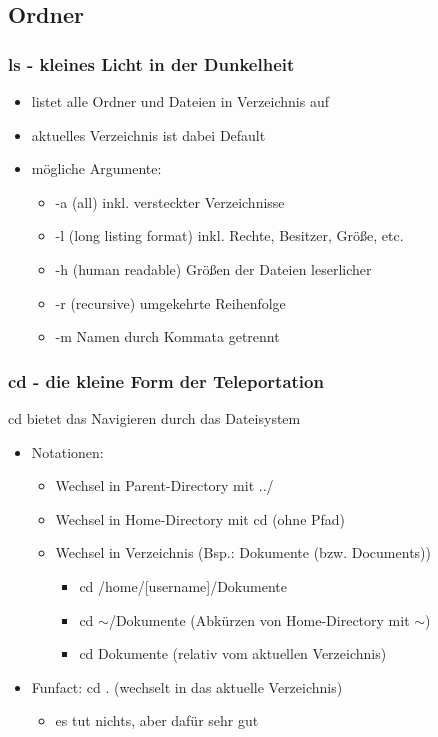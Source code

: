 \documentclass[12pt,utf8]{beamer}
\begin{document}
\subsection{Ordner}
\begin{frame}
\frametitle{ls - kleines Licht in der Dunkelheit}
\begin{itemize}
	\item listet alle Ordner und Dateien in Verzeichnis auf
	\item aktuelles Verzeichnis ist dabei Default
	\item mögliche Argumente:
	\begin{itemize}[<+->]
		\item -a  (all) inkl. versteckter Verzeichnisse
		\item -l  (long listing format) inkl. Rechte, Besitzer, Größe, etc.
		\item -h  (human readable) Größen der Dateien leserlicher
		\item -r  (recursive) umgekehrte Reihenfolge
		\item -m  Namen durch Kommata getrennt
	\end{itemize}
\end{itemize}
\end{frame}

\begin{frame}
\frametitle{cd - die kleine Form der Teleportation}
cd bietet das Navigieren durch das Dateisystem
\begin{itemize}[<+->]
	\item Notationen:	
	\begin{itemize}[<+->]
		\item Wechsel in Parent-Directory mit ../
		\item Wechsel in Home-Directory mit cd   (ohne Pfad)
		\item Wechsel in Verzeichnis (Bsp.: Dokumente (bzw. Documents))
		\begin{itemize}[<+->]
			\item cd /home/[username]/Dokumente
			\item cd $\sim$/Dokumente   (Abkürzen von Home-Directory mit $\sim$)
			\item cd Dokumente    (relativ vom aktuellen Verzeichnis)
		\end{itemize}
	\end{itemize}
	\item Funfact: cd .  (wechselt in das aktuelle Verzeichnis)
	\begin{itemize}
		\item es tut nichts, aber dafür sehr gut
	\end{itemize}
\end{itemize}
\end{frame}
\end{document}
